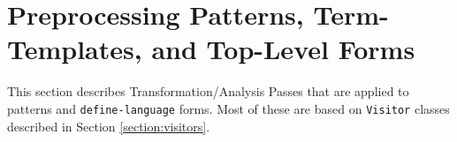 \chapter{Preprocessing Patterns, Term-Templates, and Top-Level Forms}

This section describes Transformation/Analysis Passes that are applied to patterns and \texttt{define-language} forms. Most of these are based on \texttt{Visitor} classes described in Section \ref{section:visitors}.






%
%






